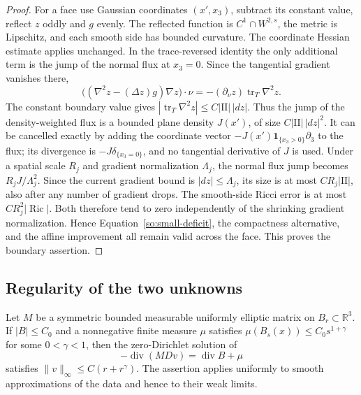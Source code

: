 \begin{proof}
For a face use Gaussian coordinates $(x',x_3)$, subtract its constant
value, reflect $z$ oddly and $g$ evenly.  The reflected function is
$C^1\cap W^{2,s}$, the metric is Lipschitz, and each smooth side has
bounded curvature.  The coordinate Hessian estimate applies unchanged.
In the trace-reversed identity the only additional term is the jump of
the normal flux at $x_3=0$.  Since the tangential gradient vanishes there,
\[
 \bigl((\nabla^2z-(\Delta z)g)\nabla z\bigr)\cdot\nu
       =-(\partial_\nu z)\operatorname{tr}_{T}\nabla^2z.
\]
The constant boundary value gives
$|\operatorname{tr}_{T}\nabla^2z|\le C|\mathrm{II}|\,|dz|$.
Thus the jump of the density-weighted flux is a bounded plane density
$J(x')$, of size $C|\mathrm{II}|\,|dz|^2$.  It can be cancelled exactly
by adding the coordinate vector
$-J(x')\mathbf1_{\{x_3>0\}}\partial_3$ to the flux; its divergence
is $-J\delta_{\{x_3=0\}}$, and no tangential derivative of $J$ is used.
Under a spatial scale $R_j$ and gradient normalization $\Lambda_j$, the
normal flux jump becomes $R_jJ/\Lambda_j^2$.  Since the current gradient
bound is $|dz|\le\Lambda_j$, its size is at most $CR_j|\mathrm{II}|$,
also after any number of gradient drops.  The smooth-side Ricci
error is at most $CR_j^2|\operatorname{Ric}|$.  Both therefore tend
to zero independently of the shrinking gradient normalization.
Hence Equation~\ref{so:small-deficit}, the compactness
alternative, and the affine improvement all remain valid across the
face.  This proves the boundary assertion.
\end{proof}

\subsection{Regularity of the two unknowns}

\begin{lemma}\label{so:potential}
Let $M$ be a symmetric bounded measurable uniformly elliptic matrix on
$B_r\subset\mathbb R^3$.  If $|B|\le C_0$ and a nonnegative finite
measure $\mu$ satisfies
$\mu(B_s(x))\le C_0s^{1+\gamma}$ for some $0<\gamma<1$, then the
zero-Dirichlet solution of
\[
 -\operatorname{div}(MDv)=\operatorname{div}B+\mu
\]
satisfies $\|v\|_\infty\le C(r+r^\gamma)$.  The assertion applies
uniformly to smooth approximations of the data and hence to their
weak limits.
\end{lemma}

